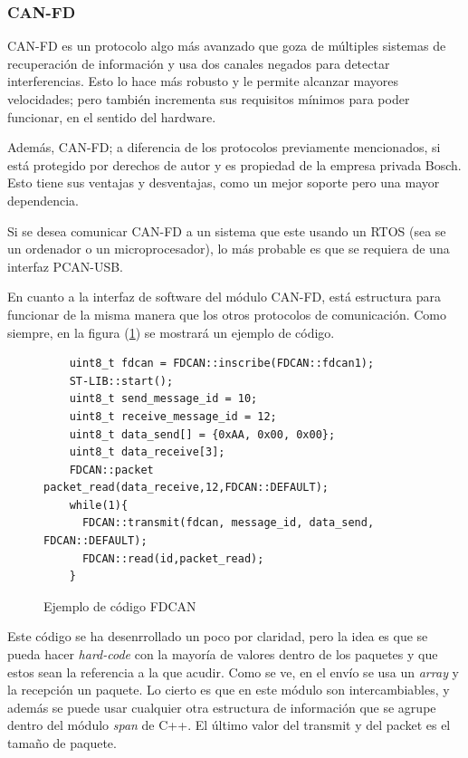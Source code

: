 \documentclass{report}
\begin{document}
\subsubsection{CAN-FD}
CAN-FD\cite{web:CANFD:CiA} es un protocolo algo más avanzado que goza de múltiples sistemas de recuperación de información y usa dos canales negados para detectar interferencias. Esto lo hace más robusto y le permite alcanzar mayores velocidades; pero también incrementa sus requisitos mínimos para poder funcionar, en el sentido del hardware. 
\par 
Además, CAN-FD; a diferencia de los protocolos previamente mencionados, si está protegido por derechos de autor y es propiedad de la empresa privada Bosch. Esto tiene sus ventajas y desventajas, como un mejor soporte pero una mayor dependencia. 
\par \vspace{0.3cm}
Si se desea comunicar CAN-FD a un sistema que este usando un RTOS (sea se un ordenador o un microprocesador), lo más probable es que se requiera de una interfaz PCAN-USB. 
\par \vspace{0.3cm}
En cuanto a la interfaz de software del módulo CAN-FD, está estructura para funcionar de la misma manera que los otros protocolos de comunicación. Como siempre, en la figura (\ref{FDCANcode}) se mostrará un ejemplo de código. 

\begin{figure}[h]
  \begin{lstlisting}
    uint8_t fdcan = FDCAN::inscribe(FDCAN::fdcan1);
    ST-LIB::start();
    uint8_t send_message_id = 10;
    uint8_t receive_message_id = 12;
    uint8_t data_send[] = {0xAA, 0x00, 0x00}; 
    uint8_t data_receive[3]; 
    FDCAN::packet packet_read(data_receive,12,FDCAN::DEFAULT);
    while(1){
      FDCAN::transmit(fdcan, message_id, data_send, FDCAN::DEFAULT);
      FDCAN::read(id,packet_read);
    }
  \end{lstlisting}
  \caption{Ejemplo de código FDCAN}
  \label{FDCANcode}
  \end{figure}

Este código se ha desenrrollado un poco por claridad, pero la idea es que se pueda hacer \textit{hard-code} con la mayoría de valores dentro de los paquetes y que estos sean la referencia a la que acudir. Como se ve, en el envío se usa un \textit{array} y la recepción un paquete. Lo cierto es que en este módulo son intercambiables, y además se puede usar cualquier otra estructura de información que se agrupe dentro del módulo \textit{span} de C++. El último valor del transmit y del packet es el tamaño de paquete. 
\end{document}

